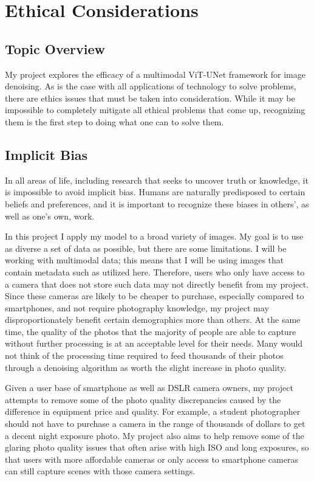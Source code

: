 \documentclass[10pt,twocolumn]{article}
\begin{document}
\section{Ethical Considerations}

\subsection{Topic Overview}
My project explores the efficacy of a multimodal ViT-UNet framework for image denoising. As is the case with all applications of technology to solve problems, there are ethics issues that must be taken into consideration. While it may be impossible to completely mitigate all ethical problems that come up, recognizing them is the first step to doing what one can to solve them.

\subsection{Implicit Bias}
In all areas of life, including research that seeks to uncover truth or knowledge, it is impossible to avoid implicit bias. Humans are naturally predisposed to certain beliefs and preferences, and it is important to recognize these biases in others', as well as one's own, work. 

In this project I apply my model to a broad variety of images. My goal is to use as diverse a set of data as possible, but there are some limitations. I will be working with multimodal data; this means that I will be using images that contain metadata such as utilized here. Therefore, users who only have access to a camera that does not store such data may not directly benefit from my project. Since these cameras are likely to be cheaper to purchase, especially compared to smartphones, and not require photography knowledge, my project may disproportionately benefit certain demographics more than others. At the same time, the quality of the photos that the majority of people are able to capture without further processing is at an acceptable level for their needs. Many would not think of the processing time required to feed thousands of their photos through a denoising algorithm as worth the slight increase in photo quality.

Given a user base of smartphone as well as DSLR camera owners, my project attempts to remove some of the photo quality discrepancies caused by the difference in equipment price and quality. For example, a student photographer should not have to purchase a camera in the range of thousands of dollars to get a decent night exposure photo. My project also aims to help remove some of the glaring photo quality issues that often arise with high ISO and long exposures, so that users with more affordable cameras or only access to smartphone cameras can still capture scenes with those camera settings.
\end{document}
